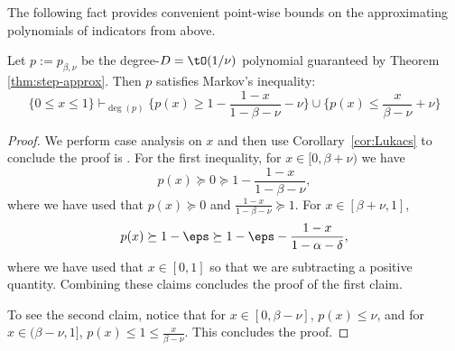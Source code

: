 The following fact provides convenient point-wise bounds on the approximating polynomials of indicators from above. %
\begin{fact}
\label{fact:bdd-markov}
Let $p := p_{\beta,\nu}$ be the degree-$D = \tO(1/\nu)$ polynomial guaranteed by Theorem \ref{thm:step-approx}.
Then $p$ satisfies Markov's inequality:
\begin{equation*}
\{0 \le x \le 1\}
\vdash_{\deg(p)} 
\{ p(x) \ge 1 - \frac{1-x}{1-\beta-\nu} - \nu\} \cup \{p(x) \le \frac{x}{\beta-\nu} + \nu\}
\end{equation*}
\end{fact}
\begin{proof}
We perform case analysis on $x$ and then use Corollary~\ref{cor:Lukacs} to conclude the proof
is \sos.
For the first inequality, for $x \in [0,\beta+\nu)$ 
we have
\[
p(x) \succeq 0 \succeq 1 - \frac{1-x}{1-\beta - \nu},
\]
where we have used that $p(x) \succeq 0$ and $\frac{1-x}{1-\beta - \nu}\succeq 1$. For $x \in [\beta +\nu, 1]$,
\[
p(x) \succeq 1 - \eps \succeq 1 - \eps - \frac{1-x}{1-\alpha-\delta},
\]
where we have used that $x \in [0,1]$ so that we are subtracting a positive quantity.
Combining these claims concludes the proof of the first claim.

To see the second claim, notice that for $x \in [0,\beta-\nu]$, $p(x) \le \nu$, and for $x \in (\beta - \nu, 1]$, $p(x) \le 1 \le \frac{x}{\beta - \nu}$.
This concludes the proof.
\end{proof}


